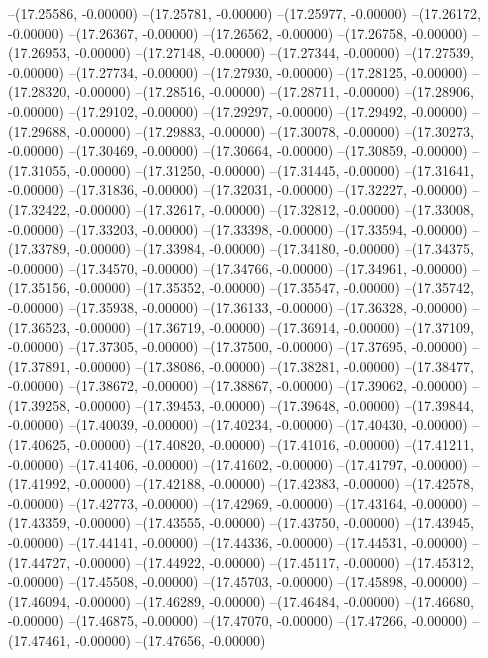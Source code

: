 --(17.25586, -0.00000)
--(17.25781, -0.00000)
--(17.25977, -0.00000)
--(17.26172, -0.00000)
--(17.26367, -0.00000)
--(17.26562, -0.00000)
--(17.26758, -0.00000)
--(17.26953, -0.00000)
--(17.27148, -0.00000)
--(17.27344, -0.00000)
--(17.27539, -0.00000)
--(17.27734, -0.00000)
--(17.27930, -0.00000)
--(17.28125, -0.00000)
--(17.28320, -0.00000)
--(17.28516, -0.00000)
--(17.28711, -0.00000)
--(17.28906, -0.00000)
--(17.29102, -0.00000)
--(17.29297, -0.00000)
--(17.29492, -0.00000)
--(17.29688, -0.00000)
--(17.29883, -0.00000)
--(17.30078, -0.00000)
--(17.30273, -0.00000)
--(17.30469, -0.00000)
--(17.30664, -0.00000)
--(17.30859, -0.00000)
--(17.31055, -0.00000)
--(17.31250, -0.00000)
--(17.31445, -0.00000)
--(17.31641, -0.00000)
--(17.31836, -0.00000)
--(17.32031, -0.00000)
--(17.32227, -0.00000)
--(17.32422, -0.00000)
--(17.32617, -0.00000)
--(17.32812, -0.00000)
--(17.33008, -0.00000)
--(17.33203, -0.00000)
--(17.33398, -0.00000)
--(17.33594, -0.00000)
--(17.33789, -0.00000)
--(17.33984, -0.00000)
--(17.34180, -0.00000)
--(17.34375, -0.00000)
--(17.34570, -0.00000)
--(17.34766, -0.00000)
--(17.34961, -0.00000)
--(17.35156, -0.00000)
--(17.35352, -0.00000)
--(17.35547, -0.00000)
--(17.35742, -0.00000)
--(17.35938, -0.00000)
--(17.36133, -0.00000)
--(17.36328, -0.00000)
--(17.36523, -0.00000)
--(17.36719, -0.00000)
--(17.36914, -0.00000)
--(17.37109, -0.00000)
--(17.37305, -0.00000)
--(17.37500, -0.00000)
--(17.37695, -0.00000)
--(17.37891, -0.00000)
--(17.38086, -0.00000)
--(17.38281, -0.00000)
--(17.38477, -0.00000)
--(17.38672, -0.00000)
--(17.38867, -0.00000)
--(17.39062, -0.00000)
--(17.39258, -0.00000)
--(17.39453, -0.00000)
--(17.39648, -0.00000)
--(17.39844, -0.00000)
--(17.40039, -0.00000)
--(17.40234, -0.00000)
--(17.40430, -0.00000)
--(17.40625, -0.00000)
--(17.40820, -0.00000)
--(17.41016, -0.00000)
--(17.41211, -0.00000)
--(17.41406, -0.00000)
--(17.41602, -0.00000)
--(17.41797, -0.00000)
--(17.41992, -0.00000)
--(17.42188, -0.00000)
--(17.42383, -0.00000)
--(17.42578, -0.00000)
--(17.42773, -0.00000)
--(17.42969, -0.00000)
--(17.43164, -0.00000)
--(17.43359, -0.00000)
--(17.43555, -0.00000)
--(17.43750, -0.00000)
--(17.43945, -0.00000)
--(17.44141, -0.00000)
--(17.44336, -0.00000)
--(17.44531, -0.00000)
--(17.44727, -0.00000)
--(17.44922, -0.00000)
--(17.45117, -0.00000)
--(17.45312, -0.00000)
--(17.45508, -0.00000)
--(17.45703, -0.00000)
--(17.45898, -0.00000)
--(17.46094, -0.00000)
--(17.46289, -0.00000)
--(17.46484, -0.00000)
--(17.46680, -0.00000)
--(17.46875, -0.00000)
--(17.47070, -0.00000)
--(17.47266, -0.00000)
--(17.47461, -0.00000)
--(17.47656, -0.00000)
